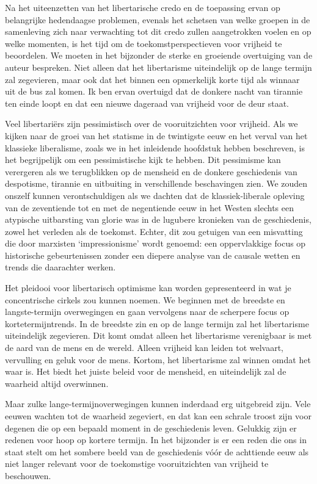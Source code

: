 \documentclass[
  a5paper,
  smalldemyvopaper,10pt,twoside,onecolumn,openright,extrafontsizes,hidelinks]{memoir}
\begin{document}
Na het uiteenzetten van het libertarische credo en de toepassing ervan
op belangrijke hedendaagse problemen, evenals het schetsen van welke
groepen in de samenleving zich naar verwachting tot dit credo zullen
aangetrokken voelen en op welke momenten, is het tijd om de
toekomstperspectieven voor vrijheid te beoordelen. We moeten in het
bijzonder de sterke en groeiende overtuiging van de auteur bespreken.
Niet alleen dat het libertarisme uiteindelijk op de lange termijn zal
zegevieren, maar ook dat het binnen een opmerkelijk korte tijd als
winnaar uit de bus zal komen. Ik ben ervan overtuigd dat de donkere
nacht van tirannie ten einde loopt en dat een nieuwe dageraad van
vrijheid voor de deur staat.

Veel libertariërs zijn pessimistisch over de vooruitzichten voor
vrijheid. Als we kijken naar de groei van het statisme in de twintigste
eeuw en het verval van het klassieke liberalisme, zoals we in het
inleidende hoofdstuk hebben beschreven, is het begrijpelijk om een
pessimistische kijk te hebben. Dit pessimisme kan verergeren als we
terugblikken op de mensheid en de donkere geschiedenis van despotisme,
tirannie en uitbuiting in verschillende beschavingen zien. We zouden
onszelf kunnen verontschuldigen als we dachten dat de klassiek-liberale
opleving van de zeventiende tot en met de negentiende eeuw in het Westen
slechts een atypische uitbarsting van glorie was in de lugubere
kronieken van de geschiedenis, zowel het verleden als de toekomst.
Echter, dit zou getuigen van een misvatting die door marxisten
`impressionisme' wordt genoemd: een oppervlakkige focus op historische
gebeurtenissen zonder een diepere analyse van de causale wetten en
trends die daarachter werken.

Het pleidooi voor libertarisch optimisme kan worden gepresenteerd in wat
je concentrische cirkels zou kunnen noemen. We beginnen met de breedste
en langste-termijn overwegingen en gaan vervolgens naar de scherpere
focus op kortetermijntrends. In de breedste zin en op de lange termijn
zal het libertarisme uiteindelijk zegevieren. Dit komt omdat alleen het
libertarisme verenigbaar is met de aard van de mens en de wereld. Alleen
vrijheid kan leiden tot welvaart, vervulling en geluk voor de mens.
Kortom, het libertarisme zal winnen omdat het waar is. Het biedt het
juiste beleid voor de mensheid, en uiteindelijk zal de waarheid altijd
overwinnen.

Maar zulke lange-termijnoverwegingen kunnen inderdaad erg uitgebreid
zijn. Vele eeuwen wachten tot de waarheid zegeviert, en dat kan een
schrale troost zijn voor degenen die op een bepaald moment in de
geschiedenis leven. Gelukkig zijn er redenen voor hoop op kortere
termijn. In het bijzonder is er een reden die ons in staat stelt om het
sombere beeld van de geschiedenis vóór de achttiende eeuw als niet
langer relevant voor de toekomstige vooruitzichten van vrijheid te
beschouwen.
\end{document}
